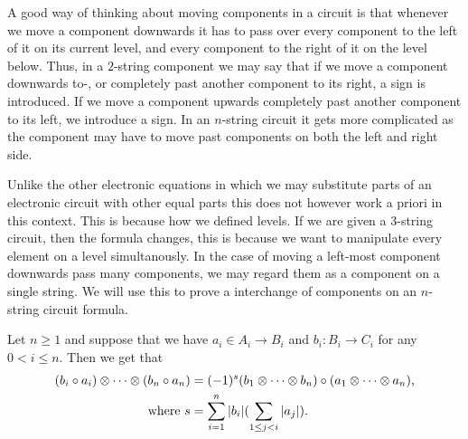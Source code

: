 \documentclass[../thesis.tex]{subfiles}
\begin{document}
            A good way of thinking about moving components in a circuit is that whenever we move a component downwards it has to pass over every component to the left of it on its current level, and every component to the right of it on the level below. Thus, in a $2$-string component we may say that if we move a component downwards to-, or completely past another component to its right, a sign is introduced. If we move a component upwards completely past another component to its left, we introduce a sign. In an $n$-string circuit it gets more complicated as the component may have to move past components on both the left and right side.

            Unlike the other electronic equations in which we may substitute parts of an electronic circuit with other equal parts this does not however work a priori in this context. This is because how we defined levels. If we are given a $3$-string circuit, then the formula changes, this is because we want to manipulate every element on a level simultanously. In the case of moving a left-most component downwards pass many components, we may regard them as a component on a single string. We will use this to prove a interchange of components on an $n$-string circuit formula.
            
            \begin{proposition}\label{prop: multi-koszul-sign}
                Let $n \geq 1$ and suppose that we have $a_i\in A_i \rightarrow B_i$ and $b_i: B_i \rightarrow C_i$ for any $0 < i \leq n $. Then we get that
                \begin{align*}
                    (b_i\circ a_i) \otimes \cdots \otimes (b_n \circ a_n) & = (-1)^s(b_1 \otimes \cdots \otimes b_n)\circ (a_1 \otimes \cdots \otimes a_n)\tt{,} \\
                    \tt{where } s & = \sum_{i=1}^n|b_i|(\sum_{1\leq j < i}|a_j|)\tt{.}
                \end{align*}
            \end{proposition}
\end{document}
